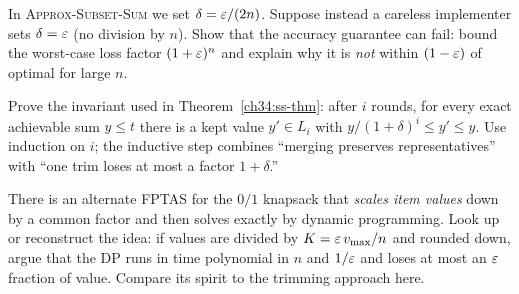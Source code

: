 \begin{exercise}
\label{ch34:ex-fptas-error}
In \textsc{Approx-Subset-Sum} we set $\delta=\varepsilon/(2n)$. Suppose instead a
careless implementer sets $\delta=\varepsilon$ (no division by $n$). Show that the
accuracy guarantee can fail: bound the worst-case loss factor $(1+\varepsilon)^{n}$
and explain why it is \emph{not} within $(1-\varepsilon)$ of optimal for large $n$.
\end{exercise}

\begin{exercise}
\label{ch34:ex-trim}
Prove the invariant used in Theorem~\ref{ch34:ss-thm}: after $i$ rounds, for
every exact achievable sum $y\le t$ there is a kept value $y'\in L_i$ with
$y/(1+\delta)^{i}\le y'\le y$. Use induction on $i$; the inductive step
combines ``merging preserves representatives'' with ``one trim loses at most a
factor $1+\delta$.''
\end{exercise}

\begin{exercise}
\label{ch34:ex-scaling}
There is an alternate FPTAS for the $0/1$ knapsack that \emph{scales item
values} down by a common factor and then solves exactly by dynamic
programming. Look up or reconstruct the idea: if values are divided by
$K=\varepsilon\,v_{\max}/n$ and rounded down, argue that the DP runs in time
polynomial in $n$ and $1/\varepsilon$ and loses at most an $\varepsilon$ fraction of value.
Compare its spirit to the trimming approach here.
\end{exercise}
